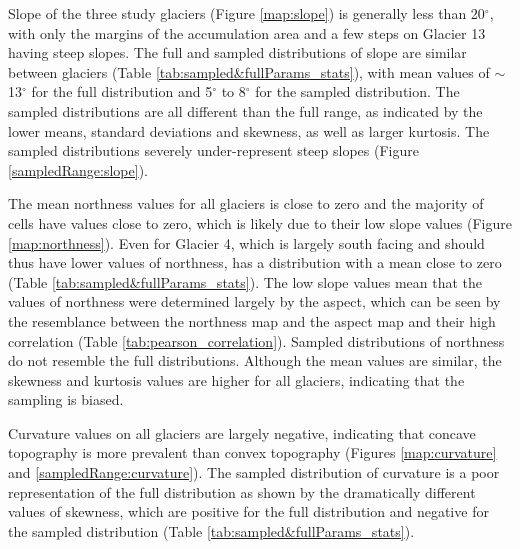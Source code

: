 \documentclass{sfuthesis}
\begin{document}
Slope of the three study glaciers (Figure \ref{map:slope}) is generally less than 20$^{\circ}$, with only the margins of the accumulation area and a few steps on Glacier 13 having steep slopes. The full and sampled distributions of slope are similar between glaciers (Table \ref{tab:sampled&fullParams_stats}), with mean values of $\sim$13$^{\circ}$ for the full distribution and 5$^{\circ}$ to 8$^{\circ}$ for the sampled distribution. The sampled distributions are all different than the full range, as indicated by the lower means, standard deviations and skewness, as well as larger kurtosis. The sampled distributions severely under-represent steep slopes (Figure \ref{sampledRange:slope}).

The mean northness values for all glaciers is close to zero and the majority of cells have values close to zero, which is likely due to their low slope values (Figure \ref{map:northness}). Even for Glacier 4, which is largely south facing and should thus have lower values of northness, has a distribution with a mean close to zero (Table \ref{tab:sampled&fullParams_stats}). The low slope values mean that the values of northness were determined largely by the aspect, which can be seen by the resemblance between the northness map and the aspect map and their high correlation (Table \ref{tab:pearson_correlation}). Sampled distributions of northness do not resemble the full distributions. Although the mean values are similar, the skewness and kurtosis values are higher for all glaciers, indicating that the sampling is biased.

Curvature values on all glaciers are largely negative, indicating that concave topography is more prevalent than convex topography (Figures \ref{map:curvature} and \ref{sampledRange:curvature}). The sampled distribution of curvature is a poor representation of the full distribution as shown by the dramatically different values of skewness, which are positive for the full distribution and negative for the sampled distribution (Table \ref{tab:sampled&fullParams_stats}). 
\end{document}
